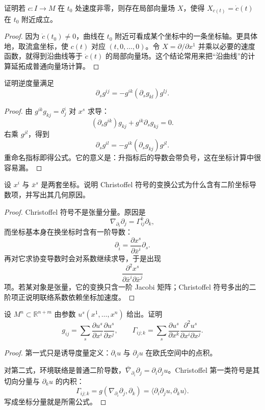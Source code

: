 \documentclass[11pt,a4paper,openany]{ctexbook}
\numberwithin{equation}{chapter}
\begin{document}
\begin{problem}
证明若 \(c\colon I\to M\) 在 \(t_0\) 处速度非零，则存在局部向量场 \(X\)，使得 \(X_{c(t)}=\dot c(t)\) 在 \(t_0\) 附近成立。
\end{problem}
\begin{proof}
因为 \(\dot c(t_0)\ne0\)，曲线在 \(t_0\) 附近可看成某个坐标中的一条坐标轴。更具体地，取流盒坐标，使 \(c(t)\) 对应 \((t,0,\ldots,0)\)。令 \(X=\partial/\partial x^1\) 并乘以必要的速度函数，就得到沿曲线等于 \(\dot c(t)\) 的局部向量场。这个结论常用来把“沿曲线”的计算延拓成普通向量场计算。
\end{proof}

\begin{problem}
证明逆度量满足
\[
\partial_s g^{ij}=-g^{ik}(\partial_sg_{kl})g^{lj}.
\]
\end{problem}
\begin{proof}
由 \(g^{ik}g_{kj}=\delta^i_j\) 对 \(x^s\) 求导：
\[
(\partial_sg^{ik})g_{kj}+g^{ik}\partial_sg_{kj}=0.
\]
右乘 \(g^{jl}\)，得到
\[
\partial_sg^{il}=-g^{ik}(\partial_sg_{kj})g^{jl}.
\]
重命名指标即得公式。它的意义是：升指标后的导数会带负号，这在坐标计算中很容易漏。
\end{proof}

\begin{problem}
设 \(x^i\) 与 \(\bar x^s\) 是两套坐标。说明 Christoffel 符号的变换公式为什么含有二阶坐标导数项，并写出其几何原因。
\end{problem}
\begin{proof}
Christoffel 符号不是张量分量。原因是
\[
\nabla_{\partial_i}\partial_j=\Gamma^k_{ij}\partial_k,
\]
而坐标基本身在换坐标时含有一阶导数：
\[
\partial_{\bar i}=\frac{\partial x^s}{\partial \bar x^i}\partial_s.
\]
再对它求协变导数时会对系数继续求导，于是出现
\[
\frac{\partial^2x^s}{\partial\bar x^i\partial\bar x^j}
\]
项。若某对象是张量，它的变换只含一阶 Jacobi 矩阵；Christoffel 符号多出的二阶项正说明联络系数依赖坐标加速度。
\end{proof}

\begin{problem}
设 \(M^n\subset\mathbb R^{n+m}\) 由参数 \(u^s(x^1,\ldots,x^n)\) 给出。证明
\[
g_{ij}=\sum_s\frac{\partial u^s}{\partial x^i}\frac{\partial u^s}{\partial x^j},
\qquad
\Gamma_{ij;k}=\sum_s\frac{\partial u^s}{\partial x^k}\frac{\partial^2u^s}{\partial x^i\partial x^j}.
\]
\end{problem}
\begin{proof}
第一式只是诱导度量定义：\(\partial_i u\) 与 \(\partial_j u\) 在欧氏空间中的点积。

对第二式，环境联络是普通二阶导数，\(\bar\nabla_{\partial_i}\partial_j=\partial_i\partial_j u\)。Christoffel 第一类符号是其切向分量与 \(\partial_k u\) 的内积：
\[
\Gamma_{ij;k}=g(\nabla_{\partial_i}\partial_j,\partial_k)
=\langle \partial_i\partial_j u,\partial_k u\rangle.
\]
写成坐标分量就是所需公式。
\end{proof}
\end{document}

